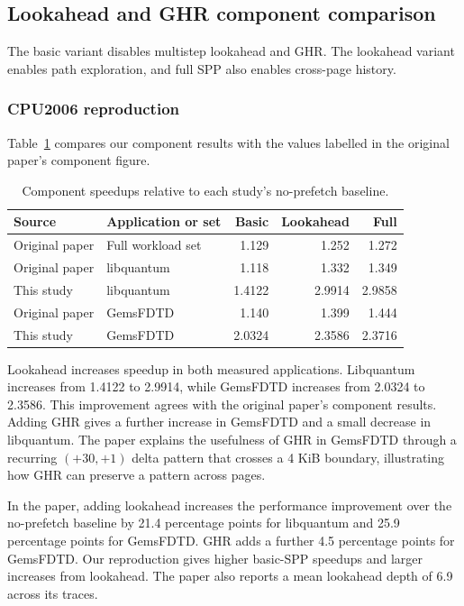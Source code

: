 \documentclass[a4paper,11pt]{article}
\begin{document}
\subsection{Lookahead and GHR component comparison}
The basic variant disables multistep lookahead and GHR. The lookahead variant enables path exploration, and full SPP also enables cross-page history.

\subsubsection{CPU2006 reproduction}
Table~\ref{tab:ablation} compares our component results with the values labelled in the original paper's component figure\cite{kim2016}.

\begin{table}[htbp]
\centering
\caption{Component speedups relative to each study's no-prefetch baseline.}\label{tab:ablation}
\begin{tabular}{@{}llrrr@{}}
\toprule
Source & Application or set & Basic & Lookahead & Full\\
\midrule
Original paper & Full workload set & 1.129 & 1.252 & 1.272\\
Original paper & libquantum & 1.118 & 1.332 & 1.349\\
This study & libquantum & 1.4122 & 2.9914 & 2.9858\\
Original paper & GemsFDTD & 1.140 & 1.399 & 1.444\\
This study & GemsFDTD & 2.0324 & 2.3586 & 2.3716\\
\bottomrule
\end{tabular}
\end{table}

Lookahead increases speedup in both measured applications. Libquantum increases from 1.4122 to 2.9914, while GemsFDTD increases from 2.0324 to 2.3586. This improvement agrees with the original paper's component results. Adding GHR gives a further increase in GemsFDTD and a small decrease in libquantum. The paper explains the usefulness of GHR in GemsFDTD through a recurring $(+30,+1)$ delta pattern that crosses a 4 KiB boundary, illustrating how GHR can preserve a pattern across pages.

In the paper, adding lookahead increases the performance improvement over the no-prefetch baseline by 21.4 percentage points for libquantum and 25.9 percentage points for GemsFDTD. GHR adds a further 4.5 percentage points for GemsFDTD. Our reproduction gives higher basic-SPP speedups and larger increases from lookahead. The paper also reports a mean lookahead depth of 6.9 across its traces.
\FloatBarrier
\end{document}
